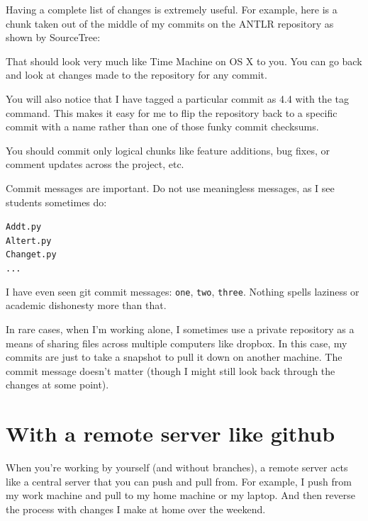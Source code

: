 \documentclass[titlepage]{tufte-book}
\begin{document}
Having a complete list of changes is extremely useful. For example, here is a chunk taken out of the middle of my commits on the ANTLR repository as shown by SourceTree:


That should look very much like Time Machine on OS X to you. You can go back and look at changes made to the repository for any commit.

You will also notice that I have tagged a particular commit as 4.4 with the tag command. This makes it easy for me to flip the repository back to a specific commit with a name rather than one of those funky commit checksums.

You should commit only logical chunks like feature additions, bug fixes, or comment updates across the project, etc.

Commit messages are important. Do not use meaningless messages, as I see students sometimes do:

\begin{alltt}
Add t.py
Alter t.py
Change t.py
...
\end{alltt}

I have even seen git commit messages: {\tt one}, {\tt two}, {\tt three}. Nothing spells laziness or academic dishonesty more than that.

In rare cases, when I'm working alone, I sometimes use a private repository as a means of sharing files across multiple computers like dropbox. In this case, my commits are just to take a snapshot to pull it down on another machine. The commit message doesn't matter (though I might still look back through the changes at some point). 

\section{With a remote server like github}

When you're working by yourself (and without branches), a remote server acts like a central server that you can push and pull from. For example, I push from my work machine and pull to my home machine or my laptop. And then reverse the process with changes I make at home over the weekend.
\end{document}

